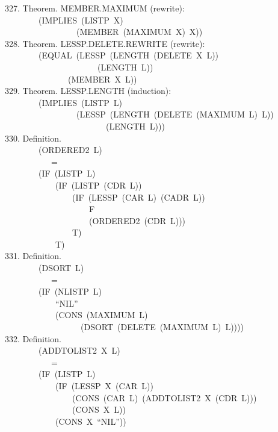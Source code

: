\documentclass[10pt]{book}
\newenvironment{pubasis}{\begin{flushleft}}{\end{flushleft}}
\begin{document}
\begin{pubasis}
327.    Theorem.  MEMBER.MAXIMUM (rewrite):\\
~~~~~~~~(IMPLIES~(LISTP~X)\\
~~~~~~~~~~~~~~~~~(MEMBER~(MAXIMUM~X)~X))\\

328.    Theorem.  LESSP.DELETE.REWRITE (rewrite):\\
~~~~~~~~(EQUAL~(LESSP~(LENGTH~(DELETE~X~L))\\
~~~~~~~~~~~~~~~~~~~~~~(LENGTH~L))\\
~~~~~~~~~~~~~~~(MEMBER~X~L))\\

329.    Theorem.  LESSP.LENGTH (induction):\\
~~~~~~~~(IMPLIES~(LISTP~L)\\
~~~~~~~~~~~~~~~~~(LESSP~(LENGTH~(DELETE~(MAXIMUM~L)~L))\\
~~~~~~~~~~~~~~~~~~~~~~~~(LENGTH~L)))\\

330.    Definition.\\
~~~~~~~~(ORDERED2~L)\\
~~~~~~~~~~~=\\
~~~~~~~~(IF~(LISTP~L)\\
~~~~~~~~~~~~(IF~(LISTP~(CDR~L))\\
~~~~~~~~~~~~~~~~(IF~(LESSP~(CAR~L)~(CADR~L))\\
~~~~~~~~~~~~~~~~~~~~F\\
~~~~~~~~~~~~~~~~~~~~(ORDERED2~(CDR~L)))\\
~~~~~~~~~~~~~~~~T)\\
~~~~~~~~~~~~T)\\

331.    Definition.\\
~~~~~~~~(DSORT~L)\\
~~~~~~~~~~~=\\
~~~~~~~~(IF~(NLISTP~L)\\
~~~~~~~~~~~~``NIL''\\
~~~~~~~~~~~~(CONS~(MAXIMUM~L)\\
~~~~~~~~~~~~~~~~~~(DSORT~(DELETE~(MAXIMUM~L)~L))))\\

332.    Definition.\\
~~~~~~~~(ADDTOLIST2~X~L)\\
~~~~~~~~~~~=\\
~~~~~~~~(IF~(LISTP~L)\\
~~~~~~~~~~~~(IF~(LESSP~X~(CAR~L))\\
~~~~~~~~~~~~~~~~(CONS~(CAR~L)~(ADDTOLIST2~X~(CDR~L)))\\
~~~~~~~~~~~~~~~~(CONS~X~L))\\
~~~~~~~~~~~~(CONS~X~``NIL''))\\


\end{pubasis}
\end{document}
